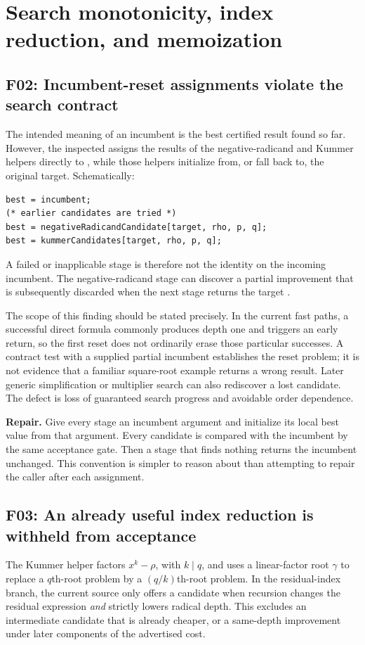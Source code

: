 \documentclass[11pt,letterpaper]{article}
\numberwithin{equation}{section}
\theoremstyle{definition}\newtheorem{definition}[theorem]{Definition}
\theoremstyle{remark}\newtheorem{remark}[theorem]{Remark}
\newcommand{\code}[1]{\texttt{\detokenize{#1}}}
\newcommand{\finding}[2]{\subsection{#1: #2}}
\begin{document}
\section{Search monotonicity, index reduction, and memoization}
\finding{F02}{Incumbent-reset assignments violate the search contract}
The intended meaning of an incumbent is the best certified result found so far. However, the inspected \code{powerProposals} assigns the results of the negative-radicand and Kummer helpers directly to \code{best}, while those helpers initialize from, or fall back to, the original target. Schematically:
\begin{lstlisting}
best = incumbent;
(* earlier candidates are tried *)
best = negativeRadicandCandidate[target, rho, p, q];
best = kummerCandidates[target, rho, p, q];
\end{lstlisting}
A failed or inapplicable stage is therefore not the identity on the incoming incumbent. The negative-radicand stage can discover a partial improvement that is subsequently discarded when the next stage returns the target \cite{source}.

The scope of this finding should be stated precisely. In the current fast paths, a successful direct formula commonly produces depth one and triggers an early return, so the first reset does not ordinarily erase those particular successes. A contract test with a supplied partial incumbent establishes the reset problem; it is not evidence that a familiar square-root example returns a wrong result. Later generic simplification or multiplier search can also rediscover a lost candidate. The defect is loss of guaranteed search progress and avoidable order dependence.

\textbf{Repair.} Give every stage an incumbent argument and initialize its local best value from that argument. Every candidate is compared with the incumbent by the same acceptance gate. Then a stage that finds nothing returns the incumbent unchanged. This convention is simpler to reason about than attempting to repair the caller after each assignment.

\finding{F03}{An already useful index reduction is withheld from acceptance}
The Kummer helper factors $x^k-\rho$, with $k\mid q$, and uses a linear-factor root $\gamma$ to replace a $q$th-root problem by a $(q/k)$th-root problem. In the residual-index branch, the current source only offers a candidate when recursion changes the residual expression \emph{and} strictly lowers radical depth. This excludes an intermediate candidate that is already cheaper, or a same-depth improvement under later components of the advertised cost.
\end{document}
